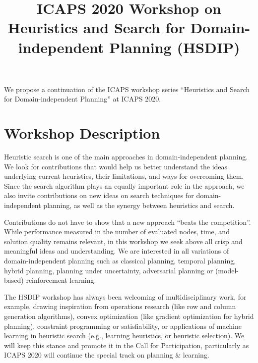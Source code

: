 \documentclass[10pt]{article}
\begin{document}
\title{ICAPS 2020 Workshop on Heuristics and Search for Domain-independent
Planning (HSDIP)%
}
\date{}

\author{}

\maketitle

\vspace{-2cm}


We propose a continuation of the ICAPS workshop series ``Heuristics
and Search for Domain-independent Planning'' at ICAPS 2020.

\section*{Workshop Description}
Heuristic search is one of the main approaches in domain-independent
planning.  We look for contributions that would help us better
understand the ideas underlying current heuristics, their limitations,
and ways for overcoming them.
%
Since the search algorithm plays an equally important role in the
approach, we also invite contributions on new ideas on search
techniques for domain-independent planning, as well as the synergy
between heuristics and search.

Contributions do not have to show that a new approach ``beats the competition''.
While performance measured in the number of evaluated nodes, time, and solution
quality remains relevant, in this workshop we seek above all crisp and
meaningful ideas and understanding.
%
We are interested in all variations of domain-independent planning
such as classical planning, temporal planning, hybrid planning, planning under
uncertainty, adversarial planning or (model-based) reinforcement learning.

The HSDIP workshop has always been welcoming of multidisciplinary work,
for example, drawing inspiration from operations research (like row and
column generation algorithms), convex optimization (like gradient
optimization for hybrid planning), constraint programming or
satisfiability, or applications of machine learning in heuristic search
(e.g., learning heuristics, or heuristic selection). We will keep this
stance and promote it in the Call for Participation, particularly as ICAPS 2020
will continue the special track on planning \& learning.
\end{document}
